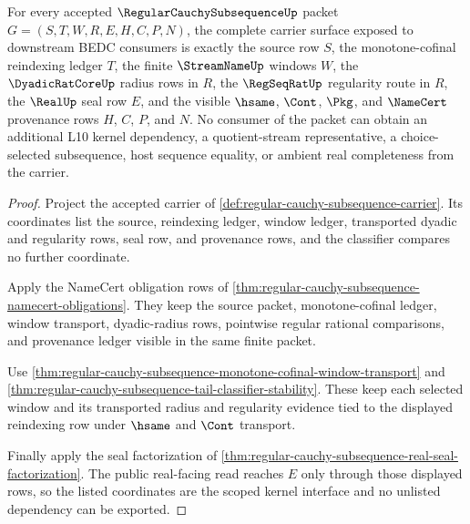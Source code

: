 \begin{theorem}
\label{thm:regular-cauchy-subsequence-scoped-kernel-interface}
For every accepted $\RegularCauchySubsequenceUp$ packet $G=(S,T,W,R,E,H,C,P,N)$, the complete carrier surface exposed to downstream BEDC consumers is exactly the source row $S$, the monotone-cofinal reindexing ledger $T$, the finite $\StreamNameUp$ windows $W$, the $\DyadicRatCoreUp$ radius rows in $R$, the $\RegSeqRatUp$ regularity route in $R$, the $\RealUp$ seal row $E$, and the visible $\hsame$, $\Cont$, $\Pkg$, and $\NameCert$ provenance rows $H$, $C$, $P$, and $N$. No consumer of the packet can obtain an additional L10 kernel dependency, a quotient-stream representative, a choice-selected subsequence, host sequence equality, or ambient real completeness from the carrier.
\end{theorem}
\begin{proof}
Project the accepted carrier of \autoref{def:regular-cauchy-subsequence-carrier}. Its coordinates list the source, reindexing ledger, window ledger, transported dyadic and regularity rows, seal row, and provenance rows, and the classifier compares no further coordinate.

Apply the NameCert obligation rows of \autoref{thm:regular-cauchy-subsequence-namecert-obligations}. They keep the source packet, monotone-cofinal ledger, window transport, dyadic-radius rows, pointwise regular rational comparisons, and provenance ledger visible in the same finite packet.

Use \autoref{thm:regular-cauchy-subsequence-monotone-cofinal-window-transport} and \autoref{thm:regular-cauchy-subsequence-tail-classifier-stability}. These keep each selected window and its transported radius and regularity evidence tied to the displayed reindexing row under $\hsame$ and $\Cont$ transport.

Finally apply the seal factorization of \autoref{thm:regular-cauchy-subsequence-real-seal-factorization}. The public real-facing read reaches $E$ only through those displayed rows, so the listed coordinates are the scoped kernel interface and no unlisted dependency can be exported.
\end{proof}

